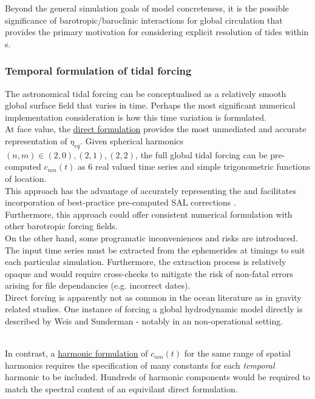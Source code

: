 Beyond the general simulation goals of model concreteness, it is the possible significance of barotropic/baroclinic interactions for global circulation that provides the primary motivation for considering explicit resolution of tides within \OGCM{}s.   



\subsubsection{Temporal formulation of tidal forcing}
\label{S:numerical_impl}

The astronomical tidal forcing can be conceptualised as a relatively smooth global surface field that varies in time. 
Perhaps the most significant numerical implementation consideration is how this time variation is formulated.\\


At face value, the \underline{direct formulation} provides the most unmediated and accurate representation of $\eta_{eq}$. Given spherical harmonics $(n,m) \in (2,0) , (2,1) , (2,2)$, the full global tidal forcing can be pre-computed $c_{nm}(t)$ as 6 real valued time series and simple trigonometric functions of location.\\
This approach has the advantage of accurately representing the \ATGP{} and facilitates incorporation of best-practice pre-computed SAL corrections \citep{Egbert:2002ug}. \\
Furthermore, this approach could offer consistent numerical formulation with other barotropic forcing fields.\\


On the other hand, some programatic inconveniences and risks are introduced. 
The input time series must be extracted from the ephemerides at timings to suit each particular simulation.  Furthermore, the extraction process is relatively opaque and would require cross-checks to mitigate the risk of non-fatal errors arising for file dependancies (e.g. incorrect dates).\\
Direct forcing is apparently not as common in the ocean literature as in gravity related studies.   
One instance of forcing a global hydrodynamic model directly is described by Weis and Sunderman \citep{Weis:2008ex} - notably in an non-operational setting.\\\



In contrast, a \underline{harmonic formulation} of $c_{nm}(t)$ for the same range of spatial harmonics requires the specification of many constants for each \emph{temporal} harmonic to be included.  
Hundreds of harmonic components \citep[pp3]{Desai:2006wo} would be required to match the spectral content of an equivilant direct formulation.\\


